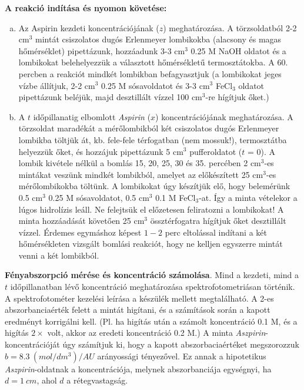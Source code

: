 \documentclass[a4paper, 12pt, twoside]{article}
\begin{document}
\textbf{A reakció indítása és nyomon követése:}

\begin{enumerate}[(a)]
\item Az Aspirin kezdeti koncentrációjának ($z$) meghatározása. A törzsoldatból 2-2 cm$^3$ mintát csiszolatos dugós Erlenmeyer lombikokba (alacsony és magas hőmérséklet) pipettázunk, hozzáadunk 3-3 cm$^3$ 0.25 M NaOH oldatot és a lombikokat belehelyezzük a választott hőmérsékletű termosztátokba. A 60. percben a reakciót mindkét lombikban befagyasztjuk (a lombikokat jeges vízbe állítjuk, 2-2 cm$^3$ 0.25 M sósavoldatot és 3-3 cm$^3$ FeCl$_3$ oldatot pipettázunk beléjük, majd desztillált vízzel 100 cm$^3$-re hígítjuk őket.)

\item A $t$ időpillanatig elbomlott \emph{Aspirin} ($x$) koncentrációjának meghatározása. A törzsoldat maradékát a mérőlombikból két csiszolatos dugós Erlenmeyer lombikba töltjük át, kb. fele-fele térfogatban (nem mossuk!), termosztátba helyezzük őket, és hozzájuk pipettázunk 5 cm$^3$ pufferoldatot ($t$ = 0). A lombik kivétele nélkül a bomlás 15, 20, 25, 30 és 35. percében 2 cm$^3$-es mintákat veszünk mindkét lombikból, amelyet az előkészített 25 cm$^3$-es mérőlombikokba töltünk. A lombikokat úgy készítjük elő, hogy belemérünk 0.5 cm$^3$ 0.25 M sósavoldatot, 0.5 cm$^3$ 0.1 M FeCl$_3$-at. Így a minta vételekor a lúgos hidrolízis leáll. Ne felejtsük el előzetesen feliratozni a lombikokat! A minta hozzáadását követően 25 cm$^3$ össztérfogatra hígítjuk őket desztillált vízzel. Érdemes egymáshoz képest $1 - 2$ perc eltolással indítani a két hőmérsékleten vizsgált bomlási reakciót, hogy ne kelljen egyszerre mintát venni a két lombikból.
\end{enumerate}

\textbf{Fényabszorpció mérése és koncentráció számolása}. Mind a kezdeti, mind a $t$ időpillanatban lévő koncentráció meghatározása spektrofotometriásan történik. A spektrofotométer kezelési leírása a készülék mellett megtalálható. A 2-es abszorbanciaérték felett a mintát higítani, és a számítások során a kapott eredményt korrigálni kell. (Pl. ha higítás után a számolt koncentráció 0.1 M, és a higítás $2\times$ volt, akkor az eredeti koncentráció 0.2 M.) A minta \emph{Aszpirin}-koncentrációját úgy számítjuk ki, hogy a kapott abszorbaciaértéket megszorozzuk $b = 8.3~(mol/dm^3) / AU$ arányossági tényezővel. Ez annak a hipotetikus \emph{Aszpirin}-oldatnak a koncentrációja, melynek abszorbanciája egységnyi, ha $d = 1~cm$, ahol $d$ a rétegvastagság.
\end{document}
